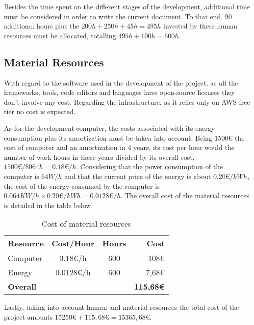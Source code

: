 Besides the time spent on the different stages of the development, additional time must be considered in order to write the current document. To that end, 90 additional hours plus the $200h + 250h + 45h = 495h$ invested by these human resources must be allocated, totalling $495h + 100h = 600h$.

\subsection*{Material Resources}

With regard to the software used in the development of the project, as all the frameworks, tools, code editors and languages have open-source licenses they don't involve any cost. Regarding the infrastructure, as it relies only on AWS free tier no cost is expected.

As for the development computer, the costs associated with its energy consumption plus its amortization must be taken into account. Being 1500€ the cost of computer and an amortization in 4 years, its cost per hour would the number of work hours in these years divided by its overall cost, $1500\euro / 8064h = 0.18\euro/h$. Considering that the power consumption of the computer is $64W/h$ and that the current price of the energy is about $0.20\euro/kWh$, the cost of the energy consumed by the computer is $0.064KW/h \times 0.20\euro/kWh = 0.0128\euro/h$. The overall cost of the material resources is detailed in the table below.

\begin{table}[H]
    \centering
    \begin{tabular}{|l|c|c|r|}
    \hline
    \textbf{Resource}   & \textbf{Cost/Hour}  & \textbf{Hours}  & \textbf{Cost} \\ \hline
    Computer            & 0.18\euro{}/h       & 600             & 108\euro{}   \\ \hline
    Energy              & 0.0128\euro{}/h     & 600             & 7,68\euro{}   \\ \hline
    \textbf{Overall}    &                     &                 & \textbf{115,68\euro{}} \\ \hline
    \end{tabular}
    \caption{Cost of material resources}
    \label{tab:material_cost}
\end{table}

Lastly, taking into account human and material resources the total cost of the project amounts $15250\euro + 115,68\euro = 15365,68\euro$.

